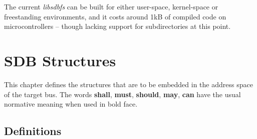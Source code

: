 \documentclass[a4paper, 12pt]{article}
\begin{document}
The current \textit{libsdbfs} can be built for either user-space,
kernel-space or freestanding environments, and it costs around
1kB of compiled code on microcontrollers -- though lacking support
for subdirectories at this point.


\section{SDB Structures}

This chapter defines the structures that are to be embedded in the
address space of the target bus.  The words \textbf{shall},
\textbf{must}, \textbf{should}, \textbf{may}, \textbf{can} have the
usual normative meaning when used in bold face.

\subsection{Definitions}
\end{document}
